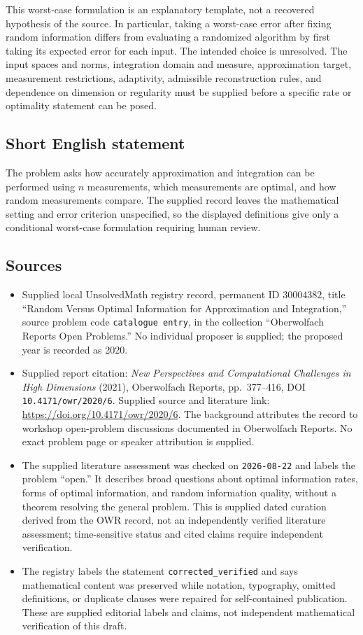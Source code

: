 \documentclass[11pt]{article}
\begin{document}
This worst-case formulation is an explanatory template, not a recovered hypothesis of the source. In particular, taking a worst-case error after fixing random information differs from evaluating a randomized algorithm by first taking its expected error for each input. The intended choice is unresolved. The input spaces and norms, integration domain and measure, approximation target, measurement restrictions, adaptivity, admissible reconstruction rules, and dependence on dimension or regularity must be supplied before a specific rate or optimality statement can be posed.
\subsection{Short English statement}
The problem asks how accurately approximation and integration can be performed using \(n\) measurements, which measurements are optimal, and how random measurements compare. The supplied record leaves the mathematical setting and error criterion unspecified, so the displayed definitions give only a conditional worst-case formulation requiring human review.
\subsection{Sources}
\begin{itemize}
\item Supplied local UnsolvedMath registry record, permanent ID \(30004382\), title ``Random Versus Optimal Information for Approximation and Integration,'' source problem code \texttt{catalogue entry}, in the collection ``Oberwolfach Reports Open Problems.'' No individual proposer is supplied; the proposed year is recorded as 2020.
\item Supplied report citation: \emph{New Perspectives and Computational Challenges in High Dimensions} (2021), Oberwolfach Reports, pp.~377--416, DOI \texttt{10.4171/owr/2020/6}. Supplied source and literature link: \url{https://doi.org/10.4171/owr/2020/6}. The background attributes the record to workshop open-problem discussions documented in Oberwolfach Reports. No exact problem page or speaker attribution is supplied.
\item The supplied literature assessment was checked on \texttt{2026-08-22} and labels the problem ``open.'' It describes broad questions about optimal information rates, forms of optimal information, and random information quality, without a theorem resolving the general problem. This is supplied dated curation derived from the OWR record, not an independently verified literature assessment; time-sensitive status and cited claims require independent verification.
\item The registry labels the statement \texttt{corrected\_verified} and says mathematical content was preserved while notation, typography, omitted definitions, or duplicate clauses were repaired for self-contained publication. These are supplied editorial labels and claims, not independent mathematical verification of this draft.
\end{itemize}
\end{document}
